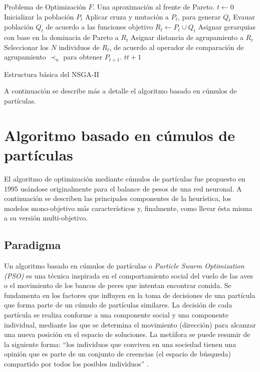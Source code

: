 \begin{itemize}
  
  \begin{algorithm}
      \begin{algorithmic}[1]			
	\REQUIRE Problema de Optimizaci\'on $F$.
	\ENSURE Una aproximaci\'on al frente de Pareto.
	\STATE $t\leftarrow0$
	\STATE Inicializar la poblaci\'on $P_t$
	    \STATE Aplicar cruza y mutaci\'on a $P_t$, para generar $Q_t$
	    \STATE Evauar poblaci\'on $Q_t$ de acuerdo a las funciones objetivo
	    \STATE $R_t \leftarrow P_t \cup Q_t$
	    \STATE Asignar gerarquias con base en la dominacia de Pareto a $R_t$
	    \STATE Asignar distancia de agrupamiento a $R_t$
	    \STATE Seleccionar los $N$ individuos de $R_t$, de acuerdo al operador de comparaci\'on de agrupamiento
	    $\prec_n$ para obtener $P_{t+1}$.
	    \STATE $t  t +1$
	\ENDWHILE
      \end{algorithmic}
  \caption{Estructura b\'asica del NSGA-II}
  \label{alg:NSGA-II}
  \end{algorithm}

  
  \end{itemize}
  A continuaci\'on se describe m\'as a detalle el algoritmo basado en c\'umulos de part\'iculas.
      
\section{Algoritmo basado en c\'umulos de part\'iculas}

  El algoritmo de optimizaci\'on mediante c\'umulos de part\'iculas fue propuesto en 1995 us\'andose originalmente
  para el balance de pesos de una red neuronal. A continuaci\'on se describen las principales componentes de la heur\'istica, 
  los modelos mono-objetivo m\'as caracter\'isticos y, finalmente, como llevar \'esta misma a su versi\'on multi-objetivo.

  \subsection{Paradigma}
  
  Un algoritmo basado en c\'umulos de part\'iculas o \textit{Particle Swarm Optimization (PSO)} es una t\'ecnica inspirada en el 
  comportamiento social del vuelo de las aves o el movimiento de los bancos de peces que intentan encontrar comida. Se fundamenta 
  en los factores que influyen en la toma de decisiones de una part\'icula que forma parte de un c\'umulo de part\'iculas similares. 
  La decisi\'on de cada part\'icula se realiza conforme a una componente social y una componente individual, mediante las que se 
  determina el movimiento (direcci\'on) para alcanzar una nueva posici\'on en el espacio de soluciones. La met\'afora se puede resumir 
  de la siguiente forma: ``los individuos que conviven en una sociedad tienen una opini\'on que es parte de un conjunto de creencias 
  (el espacio de b\'usqueda) compartido por todos los posibles individuos'' \cite{JKennedySI}. 
  
